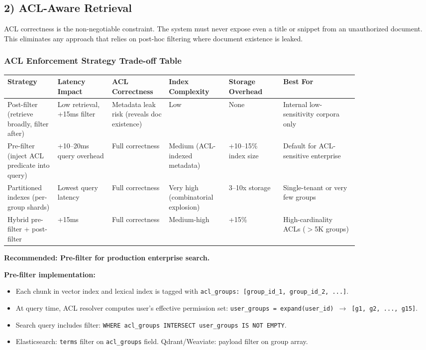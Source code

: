 \subsection*{2) ACL-Aware Retrieval}

ACL correctness is the non-negotiable constraint. The system must never expose even a title or snippet from an unauthorized document. This eliminates any approach that relies on post-hoc filtering where document existence is leaked.

\subsubsection*{ACL Enforcement Strategy Trade-off Table}

\small
\begin{tabular}{|p{0.12\linewidth}|p{0.13\linewidth}|p{0.13\linewidth}|p{0.13\linewidth}|p{0.13\linewidth}|p{0.18\linewidth}|}
\hline
\textbf{Strategy} & \textbf{Latency Impact} & \textbf{ACL Correctness} & \textbf{Index Complexity} & \textbf{Storage Overhead} & \textbf{Best For} \\
\hline
Post-filter (retrieve broadly, filter after) & Low retrieval, +15ms filter & Metadata leak risk (reveals doc existence) & Low & None & Internal low-sensitivity corpora only \\
\hline
Pre-filter (inject ACL predicate into query) & +10--20ms query overhead & Full correctness & Medium (ACL-indexed metadata) & +10--15\% index size & Default for ACL-sensitive enterprise \\
\hline
Partitioned indexes (per-group shards) & Lowest query latency & Full correctness & Very high (combinatorial explosion) & 3--10x storage & Single-tenant or very few groups \\
\hline
Hybrid pre-filter + post-filter & +15ms & Full correctness & Medium-high & +15\% & High-cardinality ACLs ($>$5K groups) \\
\hline
\end{tabular}
\normalsize

\textbf{Recommended: Pre-filter for production enterprise search.}

\textbf{Pre-filter implementation:}

\begin{itemize}
  \item Each chunk in vector index and lexical index is tagged with \texttt{acl\_groups: [group\_id\_1, group\_id\_2, ...]}.
  \item At query time, ACL resolver computes user's effective permission set: \texttt{user\_groups = expand(user\_id) $\rightarrow$ [g1, g2, ..., g15]}.
  \item Search query includes filter: \texttt{WHERE acl\_groups INTERSECT user\_groups IS NOT EMPTY}.
  \item Elasticsearch: \texttt{terms} filter on \texttt{acl\_groups} field. Qdrant/Weaviate: payload filter on group array.
\end{itemize}

